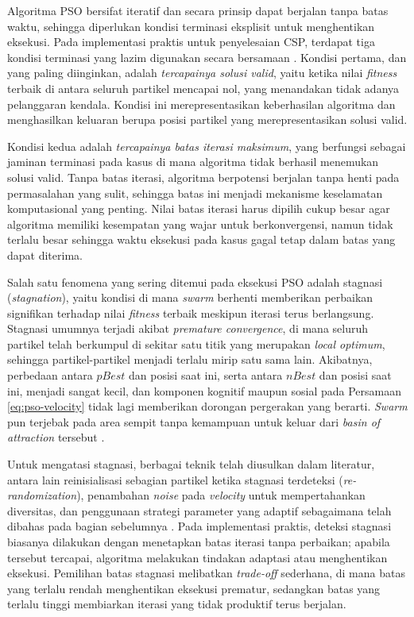 Algoritma PSO bersifat iteratif dan secara prinsip dapat berjalan tanpa batas waktu, sehingga diperlukan kondisi terminasi eksplisit untuk menghentikan eksekusi. Pada implementasi praktis untuk penyelesaian CSP, terdapat tiga kondisi terminasi yang lazim digunakan secara bersamaan \cite{engelbrecht2007computational}. Kondisi pertama, dan yang paling diinginkan, adalah \textit{tercapainya solusi valid}, yaitu ketika nilai \textit{fitness} terbaik di antara seluruh partikel mencapai nol, yang menandakan tidak adanya pelanggaran kendala. Kondisi ini merepresentasikan keberhasilan algoritma dan menghasilkan keluaran berupa posisi partikel yang merepresentasikan solusi valid.

Kondisi kedua adalah \textit{tercapainya batas iterasi maksimum}, yang berfungsi sebagai jaminan terminasi pada kasus di mana algoritma tidak berhasil menemukan solusi valid. Tanpa batas iterasi, algoritma berpotensi berjalan tanpa henti pada permasalahan yang sulit, sehingga batas ini menjadi mekanisme keselamatan komputasional yang penting. Nilai batas iterasi harus dipilih cukup besar agar algoritma memiliki kesempatan yang wajar untuk berkonvergensi, namun tidak terlalu besar sehingga waktu eksekusi pada kasus gagal tetap dalam batas yang dapat diterima.

Salah satu fenomena yang sering ditemui pada eksekusi PSO adalah stagnasi (\textit{stagnation}), yaitu kondisi di mana \textit{swarm} berhenti memberikan perbaikan signifikan terhadap nilai \textit{fitness} terbaik meskipun iterasi terus berlangsung. Stagnasi umumnya terjadi akibat \textit{premature convergence}, di mana seluruh partikel telah berkumpul di sekitar satu titik yang merupakan \textit{local optimum}, sehingga partikel-partikel menjadi terlalu mirip satu sama lain. Akibatnya, perbedaan antara $pBest$ dan posisi saat ini, serta antara $nBest$ dan posisi saat ini, menjadi sangat kecil, dan komponen kognitif maupun sosial pada Persamaan \ref{eq:pso-velocity} tidak lagi memberikan dorongan pergerakan yang berarti. \textit{Swarm} pun terjebak pada area sempit tanpa kemampuan untuk keluar dari \textit{basin of attraction} tersebut \cite{engelbrecht2007computational}.

Untuk mengatasi stagnasi, berbagai teknik telah diusulkan dalam literatur, antara lain reinisialisasi sebagian partikel ketika stagnasi terdeteksi (\textit{re-randomization}), penambahan \textit{noise} pada \textit{velocity} untuk mempertahankan diversitas, dan penggunaan strategi parameter yang adaptif sebagaimana telah dibahas pada bagian sebelumnya \cite{engelbrecht2007computational}. Pada implementasi praktis, deteksi stagnasi biasanya dilakukan dengan menetapkan batas iterasi tanpa perbaikan; apabila tersebut tercapai, algoritma melakukan tindakan adaptasi atau menghentikan eksekusi. Pemilihan batas stagnasi melibatkan \textit{trade-off} sederhana, di mana batas yang terlalu rendah menghentikan eksekusi prematur, sedangkan batas yang terlalu tinggi membiarkan iterasi yang tidak produktif terus berjalan.




